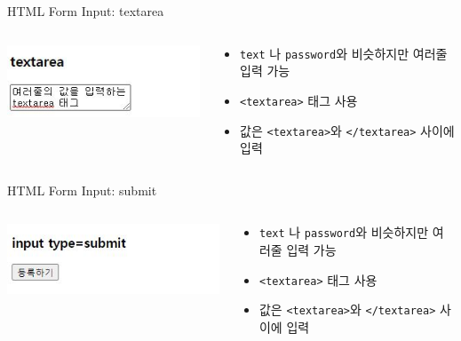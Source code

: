 \documentclass{beamer}
\begin{document}
    \begin{frame}{HTML Form Input: textarea}
        \begin{columns}
            \begin{column}{0.35\linewidth}
                \includegraphics[width=\linewidth]{Images/textarea_tag.JPG}
            \end{column}
            \begin{column}{0.65\linewidth}
                \begin{itemize}
                    \item \texttt{text} 나 \texttt{password}와 비슷하지만 여러줄 입력 가능
                    \item \texttt{<textarea>} 태그 사용
                    \item 값은 \texttt{<textarea>}와 \texttt{</textarea>} 사이에 입력
                \end{itemize}
            \end{column}
        \end{columns}
    \end{frame}

    \begin{frame}{HTML Form Input: submit}
        \begin{columns}
            \begin{column}{0.35\linewidth}
                \includegraphics[width=\linewidth]{Images/submit_tag.JPG}
            \end{column}
            \begin{column}{0.65\linewidth}
                \begin{itemize}
                    \item \texttt{text} 나 \texttt{password}와 비슷하지만 여러줄 입력 가능
                    \item \texttt{<textarea>} 태그 사용
                    \item 값은 \texttt{<textarea>}와 \texttt{</textarea>} 사이에 입력
                \end{itemize}
            \end{column}
        \end{columns}
    \end{frame}
\end{document}
